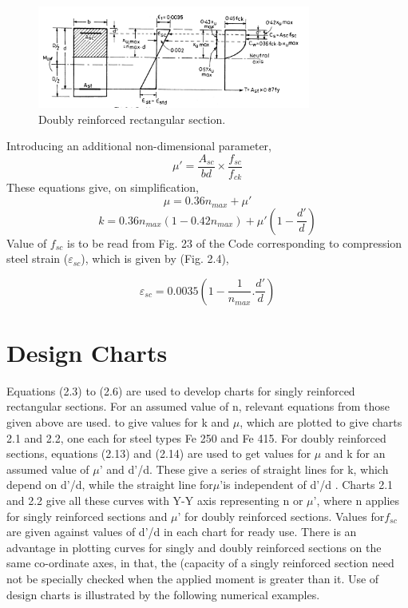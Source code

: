 \begin{figure}
\centering
\includegraphics[width=0.8\textwidth]{images/ch2-4.png}
\caption{Doubly reinforced rectangular section.}
\label{fig: reinforced section}
\end{figure}
Introducing an additional non-dimensional parameter,
\begin{equation*}
\mu' = \frac{A_{sc}}{bd} \times \frac{f_{sc}}{f_{ck}}
\end{equation*}
These equations give, on simplification,
\begin{equation}
\mu=0.36n_{max} + \mu'
\end{equation}
\newpage
\begin{equation}
k=0.36n_{max}(1-0.42n_{max}) + \mu'(1-\frac{d'}{d})
\end{equation}
Value of ${f_{sc}}$ is to be read from Fig. 23 of the Code corresponding to compression steel strain
($\varepsilon_{sc}$), which is given by (Fig. 2.4),

\begin{equation}
\varepsilon_{sc} = 0.0035(1-\frac{1}{n_{max}}.\frac{d'}{d})
\end{equation}
\section{Design Charts}
Equations (2.3) to (2.6) are used to develop charts for singly reinforced rectangular
sections. For an assumed value of n, relevant equations from those given above are used. to
give values for k and ${\mu}$, which are plotted to give charts 2.1 and 2.2, one each for steel types
Fe 250 and Fe 415. For doubly reinforced sections, equations (2.13) and (2.14) are used to get
values for ${\mu}$ and k for an assumed value of ${\mu’}$ and d'/d. These give a series of straight lines for
k, which depend on d'/d, while the straight line for${\mu’}$is independent of d'/d . Charts 2.1 and 2.2
give all these curves with Y-Y axis representing n or ${\mu’}$, where n applies for singly reinforced
sections and ${\mu’}$ for doubly reinforced sections. Values for${f_{sc}}$ are given against values of d'/d in
each chart for ready use. There is an advantage in plotting curves for singly and doubly
reinforced sections on the same co-ordinate axes, in that, the (capacity of a singly reinforced
section need not be specially checked when the applied moment is greater than it. Use of design
charts is illustrated by the following numerical examples.
